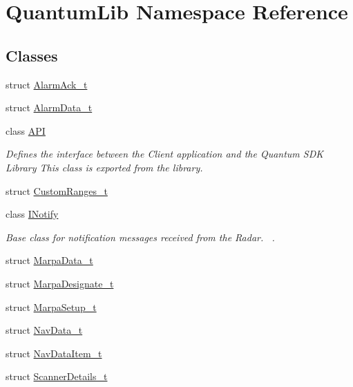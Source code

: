 \hypertarget{namespace_quantum_lib}{}\section{Quantum\+Lib Namespace Reference}
\label{namespace_quantum_lib}
\subsection*{Classes}
\begin{DoxyCompactItemize}
\item 
struct \mbox{\hyperlink{struct_quantum_lib_1_1_alarm_ack__t}{Alarm\+Ack\+\_\+t}}
\item 
struct \mbox{\hyperlink{struct_quantum_lib_1_1_alarm_data__t}{Alarm\+Data\+\_\+t}}
\item 
class \mbox{\hyperlink{class_quantum_lib_1_1_a_p_i}{A\+PI}}
\begin{DoxyCompactList}\small\item\em Defines the interface between the Client application and the Quantum S\+DK Library This class is exported from the library. \end{DoxyCompactList}\item 
struct \mbox{\hyperlink{struct_quantum_lib_1_1_custom_ranges__t}{Custom\+Ranges\+\_\+t}}
\item 
class \mbox{\hyperlink{class_quantum_lib_1_1_i_notify}{I\+Notify}}
\begin{DoxyCompactList}\small\item\em Base class for notification messages received from the Radar.~\newline
. \end{DoxyCompactList}\item 
struct \mbox{\hyperlink{struct_quantum_lib_1_1_marpa_data__t}{Marpa\+Data\+\_\+t}}
\item 
struct \mbox{\hyperlink{struct_quantum_lib_1_1_marpa_designate__t}{Marpa\+Designate\+\_\+t}}
\item 
struct \mbox{\hyperlink{struct_quantum_lib_1_1_marpa_setup__t}{Marpa\+Setup\+\_\+t}}
\item 
struct \mbox{\hyperlink{struct_quantum_lib_1_1_nav_data__t}{Nav\+Data\+\_\+t}}
\item 
struct \mbox{\hyperlink{struct_quantum_lib_1_1_nav_data_item__t}{Nav\+Data\+Item\+\_\+t}}
\item 
struct \mbox{\hyperlink{struct_quantum_lib_1_1_scanner_details__t}{Scanner\+Details\+\_\+t}}
\item 

\end{DoxyCompactItemize}
